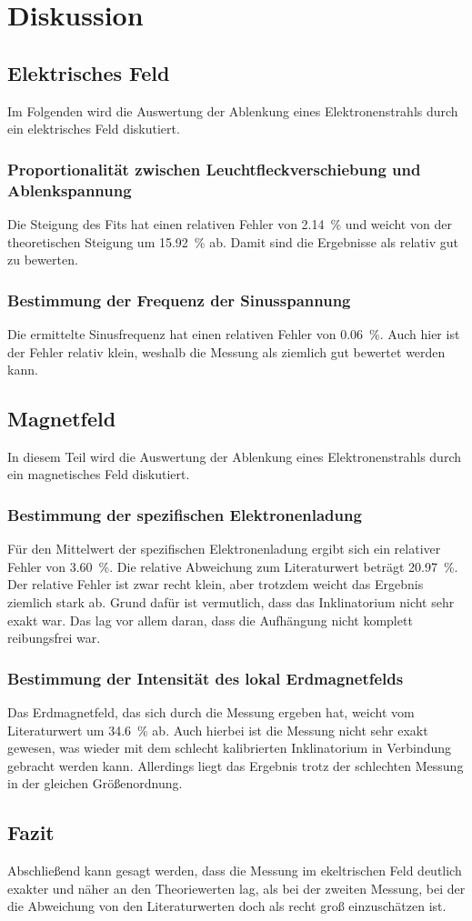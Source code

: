 \section{Diskussion}
\label{sec:Diskussion}

\subsection{Elektrisches Feld}
Im Folgenden wird die Auswertung der Ablenkung eines Elektronenstrahls durch ein elektrisches Feld diskutiert. 

\subsubsection{Proportionalität zwischen Leuchtfleckverschiebung und Ablenkspannung}
Die Steigung des Fits hat einen relativen Fehler von \SI{2.14}{\percent} und weicht von der 
theoretischen Steigung um \SI{15.92}{\percent} ab. Damit sind die Ergebnisse als relativ gut zu bewerten.

\subsubsection{Bestimmung der Frequenz der Sinusspannung}
Die ermittelte Sinusfrequenz hat einen relativen Fehler von \SI{0.06}{\percent}. Auch hier ist der Fehler relativ klein, 
weshalb die Messung als ziemlich gut bewertet werden kann. 


\subsection{Magnetfeld}
In diesem Teil wird die Auswertung der Ablenkung eines Elektronenstrahls durch ein magnetisches Feld diskutiert. 

\subsubsection{Bestimmung der spezifischen Elektronenladung}
Für den Mittelwert der spezifischen Elektronenladung ergibt sich ein relativer Fehler von \SI{3.60}{\percent}. Die relative 
Abweichung zum Literaturwert beträgt \SI{20.97}{\percent}. Der relative Fehler ist zwar recht klein, aber trotzdem weicht das Ergebnis 
ziemlich stark ab. 
Grund dafür ist vermutlich, dass das Inklinatorium nicht sehr exakt war. Das lag vor allem daran, dass die Aufhängung nicht komplett reibungsfrei war. 


\subsubsection{Bestimmung der Intensität des lokal Erdmagnetfelds}
Das Erdmagnetfeld, das sich durch die Messung ergeben hat, weicht vom Literaturwert um \SI{34.6}{\percent} ab. Auch hierbei ist die Messung 
nicht sehr exakt gewesen, was wieder mit dem schlecht kalibrierten Inklinatorium in Verbindung gebracht werden kann.
Allerdings liegt das Ergebnis trotz der schlechten Messung in der gleichen Größenordnung.

\subsection{Fazit}
Abschließend kann gesagt werden, dass die Messung im ekeltrischen Feld deutlich exakter und näher an den Theoriewerten lag, als bei der 
zweiten Messung, bei der die Abweichung von den Literaturwerten doch als recht groß einzuschätzen ist. 
